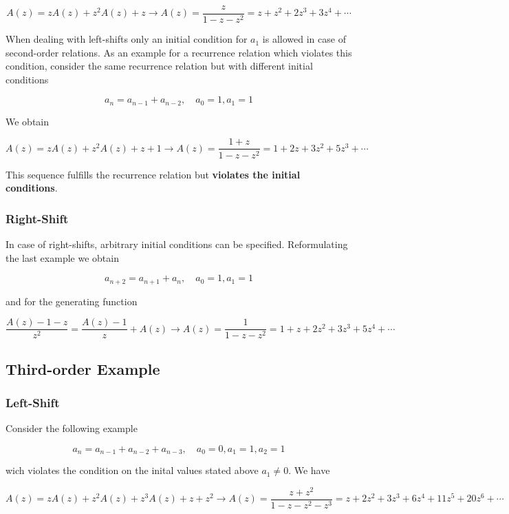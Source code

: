 \[ A(z) = z A(z) + z^2 A(z) + z \rightarrow A(z) = \frac{z}{1-z-z^2} = z + z^2 + 2z^3 + 3z^4 + \cdots \]

When dealing with left-shifts only an initial condition for $a_1$ is allowed in case of second-order relations. As an example for a recurrence relation which violates this condition, consider the same recurrence relation but with different initial conditions

\[ a_n = a_{n-1} + a_{n-2}, \quad a_0 = 1, a_1 = 1 \]

We obtain

\[ A(z) = z A(z) + z^2 A(z) + z + 1 \rightarrow A(z) = \frac{1 + z}{1-z-z^2} = 1 + 2z + 3z^2 + 5z^3 + \cdots \]

This sequence fulfills the recurrence relation but \textbf{violates the initial conditions}.

\subsubsection{Right-Shift}\label{right-shift-1}

In case of right-shifts, arbitrary initial conditions can be specified. Reformulating the last example we obtain

\[ a_{n+2} = a_{n+1} + a_{n}, \quad a_0 = 1, a_1 = 1 \]

and for the generating function

\[ \frac{A(z) - 1 - z}{z^2}  = \frac{A(z) - 1}{z} + A(z) \rightarrow A(z) = \frac{1}{1-z-z^2} = 1 + z + 2z^2 + 3z^3 + 5z^4 + \cdots \]

\subsection{Third-order Example}\label{third-order-example}

\subsubsection{Left-Shift}\label{left-shift-2}

Consider the following example

\[ a_n = a_{n-1} + a_{n-2} + a_{n-3}, \quad a_0 = 0, a_1 = 1, a_2 = 1 \]

wich violates the condition on the inital values stated above $a_1 \neq 0$. We have

\[ A(z) = zA(z) + z^2A(z) + z^3 A(z) + z + z^2 \rightarrow A(z) = \frac{z + z^2}{1 - z - z^2 - z^3} = z + 2z^2 + 3z^3 + 6z^4 + 11z^5 + 20 z^6 + \cdots\]

